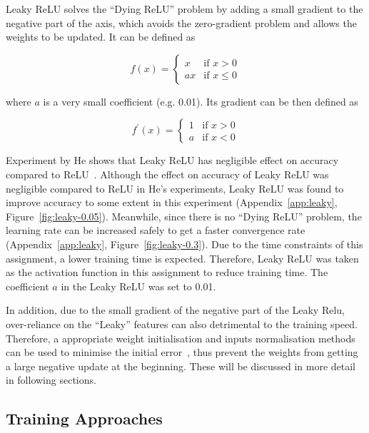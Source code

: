 \documentclass[conference]{IEEEtran}
\begin{document}
Leaky ReLU solves the ``Dying ReLU'' problem by adding a small gradient to the negative part of the axis, which avoids the zero-gradient problem and allows the weights to be updated. It can be defined as

\begin{equation}
    f(x)=
    \begin{cases}
        x& \text{if }x>0\\
        ax& \text{if }x\leq0
    \end{cases}
\end{equation}

where \(a\) is a very small coefficient (e.g. 0.01). Its gradient can be then defined as

\begin{equation}
    f^{'}(x)=
    \begin{cases}
        1& \text{if }x>0\\
        a& \text{if }x<0
    \end{cases}
\end{equation}

Experiment by He shows that Leaky ReLU has negligible effect on accuracy compared to ReLU~\cite{he2015delving}. Although the effect on accuracy of Leaky ReLU was negligible compared to ReLU in He's experiments, Leaky ReLU was found to improve accuracy to some extent in this experiment (Appendix~\ref{app:leaky}, Figure~\ref{fig:leaky-0.05}). Meanwhile, since there is no ``Dying ReLU'' problem, the learning rate can be increased safely to get a faster convergence rate (Appendix~\ref{app:leaky}, Figure~\ref{fig:leaky-0.3}). Due to the time constraints of this assignment, a lower training time is expected. Therefore, Leaky ReLU was taken as the activation function in this assignment to reduce training time. The coefficient \(a\) in the Leaky ReLU was set to 0.01. 

In addition, due to the small gradient of the negative part of the Leaky Relu, over-reliance on the ``Leaky'' features can also detrimental to the training speed. Therefore, a appropriate weight initialisation and inputs normalisation methods can be used to minimise the initial error~\cite{he2015delving}, thus prevent the weights from getting a large negative update at the beginning. These will be discussed in more detail in following sections.

\subsection{Training Approaches}
\end{document}
